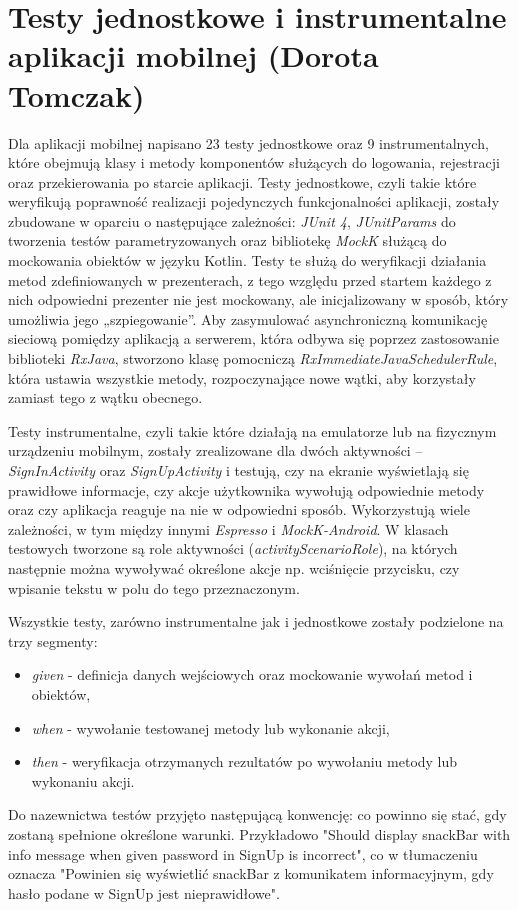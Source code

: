 \documentclass[10pt,twoside,a4paper]{report}
\begin{document}
\section{Testy jednostkowe i instrumentalne aplikacji mobilnej (Dorota Tomczak)}
\par Dla aplikacji mobilnej napisano 23 testy jednostkowe oraz 9 instrumentalnych, które obejmują klasy i metody komponentów służących do logowania, rejestracji oraz przekierowania po starcie aplikacji. Testy jednostkowe, czyli takie które weryfikują poprawność realizacji pojedynczych funkcjonalności aplikacji, zostały zbudowane w oparciu o następujące zależności: \textit{JUnit 4}\cite{JUnit}, \textit{JUnitParams}\cite{JUnitParms} do tworzenia testów parametryzowanych oraz bibliotekę \textit{MockK}\cite{MockK} służącą do mockowania obiektów w języku Kotlin. Testy te służą do weryfikacji działania metod zdefiniowanych w prezenterach, z tego względu przed startem każdego z nich odpowiedni prezenter nie jest mockowany, ale inicjalizowany w sposób, który umożliwia jego „szpiegowanie”. Aby zasymulować asynchroniczną komunikację sieciową pomiędzy aplikacją a serwerem, która odbywa się poprzez zastosowanie biblioteki \textit{RxJava}\cite{RxJava}, stworzono klasę pomocniczą \textit{RxImmediateJavaSchedulerRule}, która ustawia wszystkie metody, rozpoczynające nowe wątki, aby korzystały zamiast tego z wątku obecnego.
\par Testy instrumentalne, czyli takie które działają na emulatorze lub na fizycznym urządzeniu mobilnym, zostały zrealizowane dla dwóch aktywności – \textit{SignInActivity} oraz \textit{SignUpActivity} i testują, czy na ekranie wyświetlają się prawidłowe informacje, czy akcje użytkownika wywołują odpowiednie metody oraz czy aplikacja reaguje na nie w odpowiedni sposób. Wykorzystują wiele zależności, w tym między innymi \textit{Espresso}\cite{Espresso} i \textit{MockK-Android}\cite{MockK-Android}. W klasach testowych tworzone są role aktywności (\textit{activityScenarioRole}), na których następnie można wywoływać określone akcje np. wciśnięcie przycisku, czy wpisanie tekstu w polu do tego przeznaczonym. 
\par Wszystkie testy, zarówno instrumentalne jak i jednostkowe zostały podzielone na trzy segmenty:
\begin{itemize}
\item \textit{given} -  definicja danych wejściowych oraz mockowanie wywołań metod i obiektów,
\item \textit{when} - wywołanie testowanej metody lub wykonanie akcji,
\item \textit{then} - weryfikacja otrzymanych rezultatów po wywołaniu metody lub wykonaniu akcji.
\end{itemize}
Do nazewnictwa testów przyjęto następującą konwencję: co powinno się stać, gdy zostaną spełnione określone warunki. Przykładowo "Should display snackBar with info message when given password in SignUp is incorrect", co w tłumaczeniu oznacza "Powinien się wyświetlić snackBar z komunikatem informacyjnym, gdy hasło podane w SignUp jest nieprawidłowe".
\end{document}
